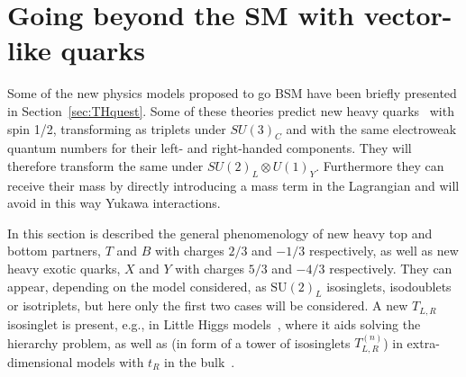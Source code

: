 
\section{Going beyond the SM with vector-like quarks}\label{sec:THvlq}

Some of the new physics models proposed to go BSM have been briefly presented in
Section~\ref{sec:THquest}. Some of these theories predict new heavy
quarks~\cite{Frampton:1999xi,AguilarSaavedra:2009es} %
with spin 1/2, transforming as triplets under $SU(3)_C$ and 
 with the same electroweak quantum numbers for their 
left- and right-handed components. They will
therefore transform the same under 
$SU(2)_L\otimes U(1)_Y$. 
Furthermore they can receive their mass
by directly introducing a mass term in the 
Lagrangian and will avoid in this way Yukawa interactions.

In this section is described the general phenomenology of new heavy top and bottom
partners, $T$ and $B$ with charges $2/3$ and $-1/3$ respectively, as
well as new heavy exotic quarks, $X$ and $Y$ with charges $5/3$ and 
$-4/3$ respectively. They can appear, depending on the model considered,
as  $\text{SU}(2)_L$ isosinglets, isodoublets or isotriplets, but here
only the first two cases will be considered. 
A new $T_{L,R}$ isosinglet is present, e.g., in 
Little Higgs models~\cite{ArkaniHamed:2001nc,Perelstein:2005ka}, 
where it aids solving the hierarchy problem, as well
as (in form of a tower of isosinglets $T_{L,R}^{(n)}$) 
in extra-dimensional models with $t_R$ 
in the bulk~\cite{delAguila:2000kb,Csaki:2004ay}. 

